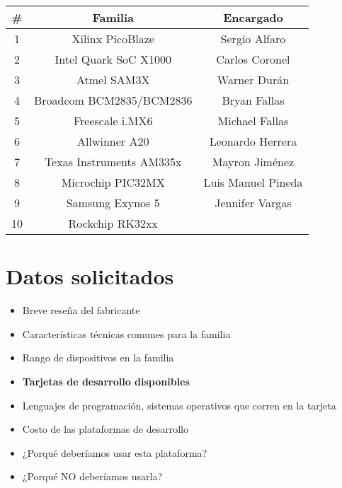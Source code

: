 \documentclass[letterpaper,10pt]{article}
\begin{document}
\begin{center}
\begin{tabular}{|c|c|c|}\hline
\#  & Familia 					& Encargado			\\ \hline\hline
1   & Xilinx PicoBlaze      	& Sergio Alfaro		\\\hline
2   & Intel Quark SoC X1000		& Carlos Coronel	\\\hline
3   & Atmel SAM3X		 		& Warner Durán		\\\hline
4   & Broadcom BCM2835/BCM2836	& Bryan Fallas		\\\hline
5   & Freescale i.MX6 			& Michael Fallas	\\\hline

6   & Allwinner A20				& Leonardo Herrera	\\\hline
7   & Texas Instruments AM335x	& Mayron Jiménez	\\\hline
8   & Microchip PIC32MX			& Luis Manuel Pineda \\\hline
9   & Samsung Exynos 5			& Jennifer Vargas	\\\hline
10  & Rockchip RK32xx			&					\\\hline

\end{tabular}
\end{center}

\section{Datos solicitados}
\begin{small}
\begin{itemize}
\item Breve reseña del fabricante
\item Características técnicas comunes para la familia
\item Rango de dispositivos en la familia
\item \textbf{Tarjetas de desarrollo disponibles}
\item Lenguajes de programación, sistemas operativos que corren en la tarjeta
\item Costo de las plataformas de desarrollo
\item ¿Porqué deberíamos usar esta plataforma?
\item ¿Porqué NO deberíamos usarla?
\end{itemize}
\end{small}
\end{document}
